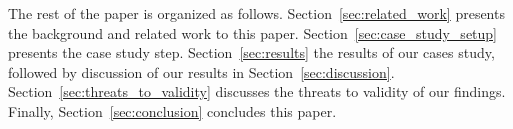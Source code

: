 
The rest of the paper is organized as follows. Section~\ref{sec:related_work} presents the background and related work to this paper. Section~\ref{sec:case_study_setup} presents the case study step. Section~\ref{sec:results} the results of our cases study, followed by discussion of our results in Section~\ref{sec:discussion}. Section~\ref{sec:threats_to_validity} discusses the threats to validity of our findings. Finally, Section~\ref{sec:conclusion} concludes this paper.
